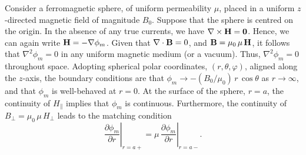 Consider a ferromagnetic sphere, of uniform permeability $\mu$, placed in
a uniform $z$-directed magnetic field of magnitude $B_0$. Suppose
that the sphere is centred on the origin. In the absence of any true currents,
we have $\nabla\times{\bf H} = {\bf 0}$. Hence, we can again write ${\bf H} = -\nabla\phi_m$. Given that $\nabla\cdot{\bf B}=0$, and ${\bf B} = \mu_0\,\mu\,{\bf H}$, it follows that $\nabla^2\phi_m=0$ in any uniform magnetic medium
(or a vacuum). Thus, $\nabla^2\phi_m=0$ throughout space. Adopting spherical polar coordinates,
$(r, \theta, \varphi)$, aligned along the $z$-axis, the boundary
conditions are that $\phi_m \rightarrow - (B_0/\mu_0)\,r\,\cos\theta$ as $r\rightarrow\infty$, and that $\phi_m$ is well-behaved at $r=0$.  At the surface of the sphere, $r=a$, the continuity of $H_\parallel$
 implies that $\phi_m$ is continuous. Furthermore, the
continuity of $B_\perp=\mu_0\,\mu\,H_\perp$  leads to the matching condition
\begin{equation}\label{emat1}
\left.\frac{\partial \phi_m}{\partial r}\right|_{r=a+} = \left.\mu\,
\frac{\partial\phi_m}{\partial r}\right|_{r=a-}.
\end{equation}

